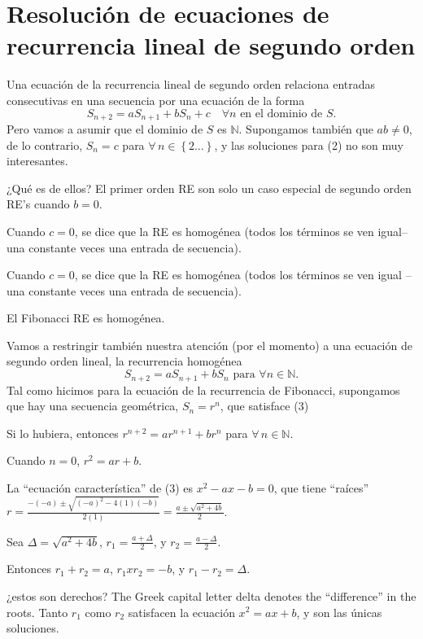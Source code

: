 \section{Resolución de ecuaciones de recurrencia lineal de segundo orden}

Una ecuación de la recurrencia lineal de segundo orden relaciona entradas consecutivas en una secuencia por una ecuación de la forma
\begin{equation}
	S_{n+2}=aS_{n+1}+bS_{n}+c\quad\forall n\text{ en el dominio de }S.
\end{equation}
Pero vamos a asumir que el dominio de $S$ es $\mathds{N}$. Supongamos también que $ab\neq0$, de lo contrario, $S_{n}=c$ para $\forall\,n \in\left\{2\ldots\right\}$, y las soluciones para (2) no son muy interesantes.

¿Qué es de ellos?
El primer orden RE son solo un caso especial de segundo orden RE’s cuando $b=0$.

Cuando $c=0$, se dice que la RE es homogénea (todos los términos se ven igual–una constante veces una entrada de secuencia).

Cuando $c=0$, se dice que la RE es homogénea (todos los términos se ven igual – una constante veces una entrada de secuencia).

El Fibonacci RE es homogénea.

Vamos a restringir también nuestra atención (por el momento) a una ecuación de segundo orden lineal, la recurrencia homogénea
\begin{equation}
	S_{n+2}=aS_{n+1}+bS_{n}\text{ para }\forall n\in\mathds{N}.
\end{equation}
Tal como hicimos para la ecuación de la recurrencia de Fibonacci, supongamos que hay una secuencia geométrica, $S_n=r^n$, que satisface (3)

Si lo hubiera, entonces $r^{n+2}=ar^{n+1}+br^{n}$ para $\forall\,n\in\mathds{N}$.

Cuando $n = 0$, $r^2=ar+b$.

La ``ecuación característica'' de (3) es $x^2-ax-b=0$, que tiene ``raíces'' $r=\tfrac{-(-a)\pm\sqrt{(-a)^2-4(1)(-b)}}{2(1)}=\tfrac{a\pm\sqrt{a^2+4b}}{2}$.

Sea $\Delta=\sqrt{a^2+4b}$, $r_1=\tfrac{a+\Delta}{2}$, y $r_2=\frac{a-\Delta}{2}$.

Entonces $r_{1}+r_{2}=a$, $r_{1}xr_{2}=-b$, y $r_{1}-r_{2}=\Delta$.

¿estos son derechos?
The Greek capital letter delta denotes the “difference” in the roots.
Tanto $r_{1}$ como $r_{2}$ satisfacen la ecuación $x^{2}=ax+b$, y son las únicas soluciones.

